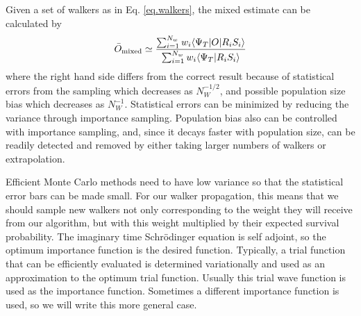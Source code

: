 Given a set of walkers as in Eq. \ref{eq.walkers}, the mixed estimate can
be calculated by
\begin{equation}
\bar O_{\rm mixed} \simeq
\frac{ \sum_{i=1}^{N_w} w_i \langle \Psi_T|O|R_i S_i\rangle}
{ \sum_{i=1}^{N_w} w_i \langle \Psi_T|R_i S_i\rangle}
\end{equation}
where the right hand side differs from the correct result because
of statistical errors from the sampling which decreases as $N_W^{-1/2}$,
and possible population size bias which decreases as $N_W^{-1}$. Statistical
errors can be minimized by reducing the variance through importance
sampling.  Population
bias also can be controlled with importance sampling, and, since it decays
faster with population size, can be readily detected
and removed by either taking larger numbers of walkers or extrapolation.

Efficient Monte Carlo methods need to have low variance so that the
statistical error bars can be made small. For our walker propagation,
this means that we should sample new walkers not only corresponding to
the weight they will receive from our algorithm, but with this weight
multiplied by their expected survival probability. The imaginary time
Schr\"odinger equation is self adjoint, so the optimum importance
function is the desired function\cite{xxx2010}. Typically, a trial
function that can be efficiently evaluated is determined variationally
and used as an approximation to the optimum trial function. Usually
this trial wave function is used as the importance
function. Sometimes a different importance function is used, so we will
write this more general case. 

